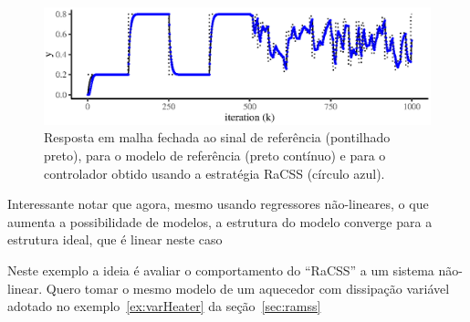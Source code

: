 \begin{exmp}
\begin{figure}[H]
  \centering
  \includegraphics{./Figs/s.motorcc.VRFT.racss_output.mf.eps}
  \caption{Resposta em malha fechada ao sinal de referência (pontilhado preto), para o modelo de referência (preto contínuo) e para o controlador obtido usando a estratégia RaCSS (círculo azul).}
  \label{fig:}
\end{figure}

Interessante notar que agora, mesmo usando regressores não-lineares, o que aumenta a possibilidade de modelos, a estrutura do modelo converge para a estrutura ideal, que é linear neste caso


\end{exmp}


\begin{exmp}
   Neste exemplo a ideia é avaliar o comportamento do ``RaCSS'' a um sistema não-linear. Quero tomar o mesmo modelo de um aquecedor com dissipação variável adotado no exemplo~\ref{ex:varHeater} da seção~\ref{sec:ramss}

%
%
%
%

\end{exmp}

